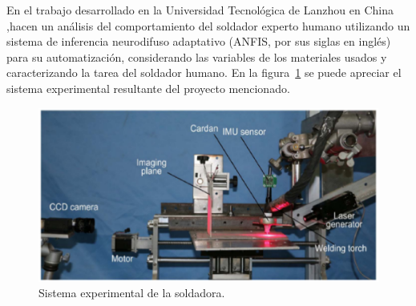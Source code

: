 
En el trabajo desarrollado en la Universidad Tecnol\'ogica de Lanzhou en China
 \cite{Zhang2017},hacen un an\'alisis del comportamiento del soldador experto
 humano utilizando un sistema de inferencia neurodifuso adaptativo (ANFIS,
 por sus siglas en ingl\'es) para su automatizaci\'on, considerando las variables
 de los materiales usados y caracterizando la tarea del soldador humano.
 En la figura~\ref{fig:syswelding} se puede apreciar el sistema experimental
  resultante del proyecto mencionado.


\begin{figure}[h]
\centering
\includegraphics[width=0.8\columnwidth]{chap2/Imagenes/Welding.eps}
\caption{Sistema experimental de la soldadora.}
\label{fig:syswelding}
\end{figure} 
 